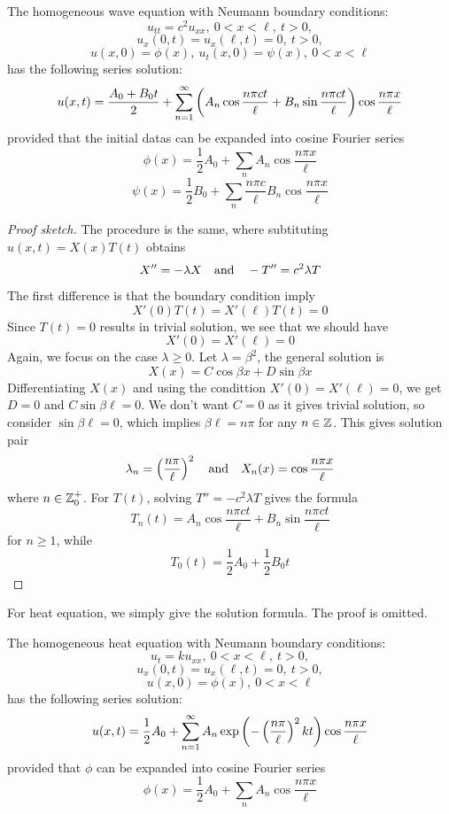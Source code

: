 \medskip 

\begin{thm}
    The homogeneous wave equation with Neumann boundary conditions:
    \[u_{tt} = c^2 u_{xx},\ 0<x<\ell,\ t>0,\]
    \[u_x(0,t) = u_x(\ell,t) = 0,\ t>0,\]
    \[u(x,0) = \phi(x),\ u_t(x,0) = \psi(x),\ 0<x<\ell\]
    has the following series solution:
    \[u(x,t) = \frac{A_0 + B_0 t}{2} + \sum_{n=1}^{\infty} \left(A_n \cos\frac{n\pi ct}{\ell} + B_n \sin\frac{n\pi ct}{\ell}\right)\cos \frac{n\pi x}{\ell}\]
    provided that the initial datas can be expanded into cosine Fourier series
    \[\phi(x) = \frac{1}{2}A_0 + \sum_n A_n \cos \frac{n\pi x}{\ell}\]
    \[\psi(x) = \frac{1}{2}B_0 + \sum_n \frac{n\pi c}{\ell}B_n \cos \frac{n\pi x}{\ell}\]
\end{thm}
\begin{proof} [Proof sketch]
    The procedure is the same, where subtituting $u(x,t) = X(x)T(t)$ obtains
    \[X'' = -\lambda X \quad \text{and} \quad -T'' = c^2 \lambda T\]
    The first difference is that the boundary condition imply 
    \[X'(0)T(t) = X'(\ell)T(t) = 0\]
    Since $T(t)=0$ results in trivial solution, we see that we should have
    \[X'(0) = X'(\ell) = 0\]
    Again, we focus on the case $\lambda\geq 0$. Let $\lambda = \beta^2$, the general solution is 
    \[X(x) = C\cos \beta x + D \sin \beta x\]
    Differentiating $X(x)$ and using the condittion $X'(0)=X'(\ell)=0$, we get $D=0$ and $C\sin \beta\ell = 0$. We don't want $C=0$ as it gives trivial solution, so consider $\sin \beta\ell = 0$, which implies $\beta\ell = n\pi$ for any $n\in {\mathbb Z}$. This gives solution pair
    \[\lambda_n = \left(\frac{n\pi}{\ell}\right)^2 \quad \text{and} \quad X_n(x) = \cos \frac{n\pi x}{\ell}\]
    where $n\in {\mathbb Z}^+_0$. For $T(t)$, solving $T''= -c^2\lambda T$ gives the formula 
    \[T_n(t) = A_n \cos \frac{n\pi ct}{\ell} + B_n \sin \frac{n\pi c t}{\ell}\]
    for $n\geq 1$, while 
    \[T_0(t) = \frac{1}{2}A_0 + \frac{1}{2}B_0 t\]
\end{proof}

For heat equation, we simply give the solution formula. The proof is omitted.

\medskip 

\begin{thm}
    The homogeneous heat equation with Neumann boundary conditions:
    \[u_{t} = k u_{xx},\ 0<x<\ell,\ t>0,\]
    \[u_x(0,t) = u_x(\ell,t) = 0,\ t>0,\]
    \[u(x,0) = \phi(x),\ 0<x<\ell\]
    has the following series solution:
    \[u(x,t) = \frac{1}{2}A_0 + \sum_{n=1}^{\infty} A_n\exp\left(-\left(\frac{n\pi}{\ell}\right)^2 kt\right)\cos \frac{n\pi x}{\ell}\]
    provided that $\phi$ can be expanded into cosine Fourier series
    \[\phi(x) = \frac{1}{2}A_0 + \sum_n A_n \cos \frac{n\pi x}{\ell}\]
\end{thm}

